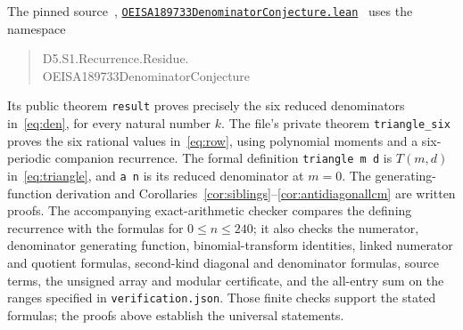 \documentclass[11pt]{article}
\begin{document}
\endgroup
The pinned source~\cite{lean},
\href{https://github.com/the-omega-institute/trureturing/blob/20b69217fd7c02cbb8668d939dfa29ecc12a9716/D5/S1/Recurrence/Residue/OEISA189733DenominatorConjecture.lean}{\texttt{OEISA189733DenominatorConjecture.lean}}~\cite{lean}
uses the namespace
\begin{quote}\small\ttfamily
D5.S1.Recurrence.Residue.\\
OEISA189733DenominatorConjecture
\end{quote}
Its public theorem \texttt{result} proves precisely the six reduced
denominators in~\eqref{eq:den}, for every natural number $k$.
The file's private theorem \texttt{triangle\_six} proves the six rational
values in~\eqref{eq:row}, using polynomial moments and a six-periodic
companion recurrence. The formal definition \texttt{triangle m d} is $T(m,d)$
in~\eqref{eq:triangle}, and \texttt{a n} is its reduced denominator at $m=0$.
The generating-function derivation and Corollaries~\ref{cor:siblings}--\ref{cor:antidiagonallcm}
are written proofs. The accompanying exact-arithmetic
checker compares the defining recurrence with the formulas for
$0\le n\le240$; it also checks the numerator, denominator generating
function, binomial-transform identities, linked numerator and quotient
formulas, second-kind diagonal and denominator formulas, source terms,
the unsigned array and modular certificate, and the all-entry sum on the ranges specified in
\texttt{verification.json}. Those finite checks support the stated formulas;
the proofs above establish the universal statements.
\end{document}
